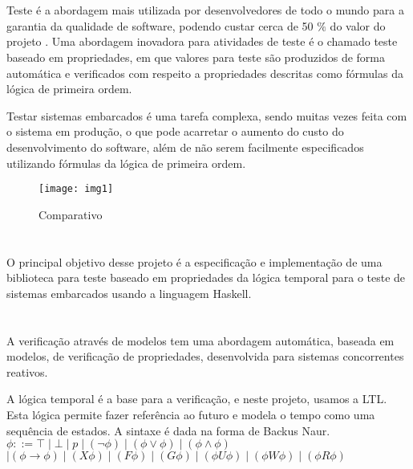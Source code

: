\documentclass{sciposter}
\newcommand{\tituloA}[1]{\Large{\emph{\textbf{\color{white}{#1}}}}}
\begin{document}
  \begin{multicols}{3}{

  \setlength{\parindent}{2em}

  \section*{\tituloA{Introdução}}
    \Large Teste é a abordagem mais utilizada por desenvolvedores de todo o mundo para a garantia da qualidade de software, podendo custar cerca de 50 $\%$ do valor do projeto \cite{myers}. Uma abordagem inovadora para atividades de teste é o chamado teste baseado em propriedades, em que valores para teste são produzidos de forma automática e verificados com respeito a propriedades descritas como fórmulas da lógica de primeira ordem. 
    \par Testar sistemas embarcados é uma tarefa complexa, sendo muitas vezes feita com o sistema em produção, o que pode acarretar o aumento do custo do desenvolvimento do software, além de não serem facilmente especificados utilizando fórmulas da lógica de primeira ordem. 
    \begin{figure}[!htb]
    	\centering
    	\texttt{[image: img1]}
    	\caption{Comparativo \cite{img}}
    \end{figure}
    
\section*{\tituloA{Objetivos}}
O principal objetivo desse projeto é a especificação e implementação de uma biblioteca para teste baseado em propriedades da lógica temporal para o teste de sistemas embarcados usando a linguagem Haskell.

\section*{\tituloA{Sintaxe da Lógica Temporal}}
A verificação através de modelos tem uma abordagem automática, baseada em modelos, de verificação de propriedades, desenvolvida para sistemas concorrentes reativos.\cite{huth}
\par A lógica temporal é a base para a verificação, e neste projeto, usamos a LTL. Esta lógica permite fazer referência ao futuro e modela o tempo como uma sequência de estados. A sintaxe é dada na forma de Backus Naur.\\
$\phi ::= \top \mid \bot \mid \textit{p}\mid (\neg \phi) \mid (\phi \vee \phi) \mid (\phi \wedge \phi)$\\$ \mid (\phi \rightarrow \phi) \mid (X\phi) \mid (F\phi) \mid (G\phi) \mid (\phi U\phi) \mid (\phi W\phi) \mid (\phi R\phi)$
\\
}
\end{multicols}
\end{document}
